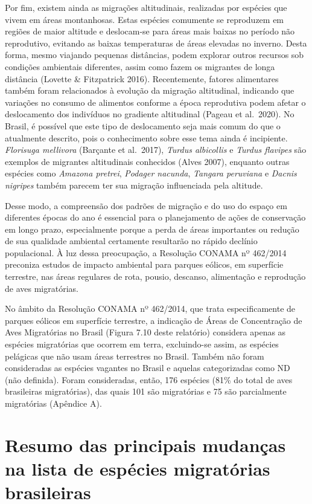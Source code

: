 \documentclass[
  oneside]{scrbook}
\begin{document}
Por fim, existem ainda as migrações altitudinais, realizadas por espécies que vivem em áreas montanhosas. Estas espécies comumente se reproduzem em regiões de maior altitude e deslocam-se para áreas mais baixas no período não reprodutivo, evitando as baixas temperaturas de áreas elevadas no inverno. Desta forma, mesmo viajando pequenas distâncias, podem explorar outros recursos sob condições ambientais diferentes, assim como fazem os migrantes de longa distância (Lovette \& Fitzpatrick 2016). Recentemente, fatores alimentares também foram relacionados à evolução da migração altitudinal, indicando que variações no consumo de alimentos conforme a época reprodutiva podem afetar o deslocamento dos indivíduos no gradiente altitudinal (Pageau et al.~2020). No Brasil, é possível que este tipo de deslocamento seja mais comum do que o atualmente descrito, pois o conhecimento sobre esse tema ainda é incipiente. \emph{Florisuga mellivora} (Barçante et al.~2017), \emph{Turdus albicollis} e \emph{Turdus flavipes} são exemplos de migrantes altitudinais conhecidos (Alves 2007), enquanto outras espécies como \emph{Amazona pretrei}, \emph{Podager nacunda}, \emph{Tangara peruviana} e \emph{Dacnis nigripes} também parecem ter sua migração influenciada pela altitude.

Desse modo, a compreensão dos padrões de migração e do uso do espaço em diferentes épocas do ano é essencial para o planejamento de ações de conservação em longo prazo, especialmente porque a perda de áreas importantes ou redução de sua qualidade ambiental certamente resultarão no rápido declínio populacional. À luz dessa preocupação, a Resolução CONAMA nº 462/2014 preconiza estudos de impacto ambiental para parques eólicos, em superfície terrestre, nas áreas regulares de rota, pousio, descanso, alimentação e reprodução de aves migratórias.

No âmbito da Resolução CONAMA nº 462/2014, que trata especificamente de parques eólicos em superfície terrestre, a indicação de Áreas de Concentração de Aves Migratórias no Brasil (Figura 7.10 deste relatório) considera apenas as espécies migratórias que ocorrem em terra, excluindo-se assim, as espécies pelágicas que não usam áreas terrestres no Brasil. Também não foram consideradas as espécies vagantes no Brasil e aquelas categorizadas como ND (não definida). Foram consideradas, então, 176 espécies (81\% do total de aves brasileiras migratórias), das quais 101 são migratórias e 75 são parcialmente migratórias (Apêndice A).

\hypertarget{resumo-das-principais-mudanuxe7as-na-lista-de-espuxe9cies-migratuxf3rias-brasileiras}{%
\section{Resumo das principais mudanças na lista de espécies migratórias brasileiras}\label{resumo-das-principais-mudanuxe7as-na-lista-de-espuxe9cies-migratuxf3rias-brasileiras}}
\end{document}
